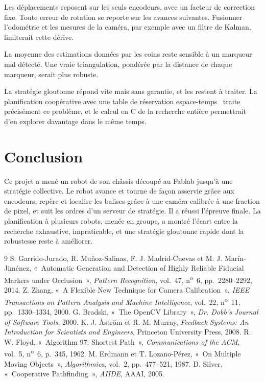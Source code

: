  Les déplacements reposent sur les seuls
encodeurs, avec un facteur de correction fixe. Toute erreur
de rotation se reporte sur les avances suivantes. Fusionner
l'odométrie et les mesures de la caméra, par exemple avec
un filtre de Kalman, limiterait cette dérive.

 La moyenne des estimations données par
les coins reste sensible à un marqueur mal détecté. Une
vraie triangulation, pondérée par la distance de chaque
marqueur, serait plus robuste.

 La stratégie gloutonne répond vite mais
sans garantie, et les  restent à traiter. La
planification coopérative avec une table de réservation
espace-temps~\cite{silver} traite précisément ce problème, et le calcul en C de la recherche entière permettrait d'en explorer
davantage dans le même temps.

\section{Conclusion}
Ce projet a mené un robot de son châssis découpé au
Fablab jusqu'à une stratégie collective. Le robot avance
et tourne de façon asservie grâce aux encodeurs, repère et
localise les balises grâce à une caméra calibrée à une fraction de pixel, et suit les ordres d'un serveur de stratégie.
Il a réussi l'épreuve finale. La planification à plusieurs robots, menée en groupe, a montré l'écart entre la recherche
exhaustive, impraticable, et une stratégie gloutonne rapide dont la robustesse reste à améliorer.

{\small
\begin{thebibliography}{9}\setlength{\itemsep}{1pt}
 S. Garrido-Jurado, R. Muñoz-Salinas, F. J. Madrid-Cuevas et M. J. Marín-Jiménez, «~Automatic Generation and Detection of Highly Reliable Fiducial Markers under Occlusion~», \emph{Pattern Recognition}, vol.~47, n\textsuperscript{o}~6, pp.~2280--2292, 2014.
 Z. Zhang, «~A Flexible New Technique for Camera Calibration~», \emph{IEEE Transactions on Pattern Analysis and Machine Intelligence}, vol.~22, n\textsuperscript{o}~11, pp.~1330--1334, 2000.
 G. Bradski, «~The OpenCV Library~», \emph{Dr. Dobb's Journal of Software Tools}, 2000.
 K. J. Åström et R. M. Murray, \emph{Feedback Systems: An Introduction for Scientists and Engineers}, Princeton University Press, 2008.
 R. W. Floyd, «~Algorithm 97: Shortest Path~», \emph{Communications of the ACM}, vol.~5, n\textsuperscript{o}~6, p.~345, 1962.
 M. Erdmann et T. Lozano-Pérez, «~On Multiple Moving Objects~», \emph{Algorithmica}, vol.~2, pp.~477--521, 1987.
 D. Silver, «~Cooperative Pathfinding~», \emph{AIIDE}, AAAI, 2005.
\end{thebibliography}}

